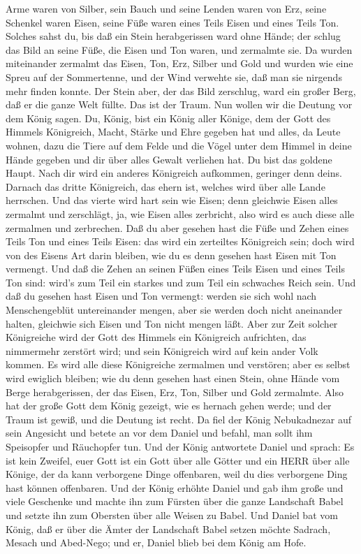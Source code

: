 Arme waren von Silber, sein Bauch und seine Lenden waren von Erz,
 seine Schenkel waren Eisen, seine Füße waren eines Teils
Eisen und eines Teils Ton.  Solches sahst du, bis daß ein
Stein herabgerissen ward ohne Hände; der schlug das Bild an seine Füße,
die Eisen und Ton waren, und zermalmte sie.  Da wurden
miteinander zermalmt das Eisen, Ton, Erz, Silber und Gold und wurden wie
eine Spreu auf der Sommertenne, und der Wind verwehte sie, daß man sie
nirgends mehr finden konnte. Der Stein aber, der das Bild zerschlug,
ward ein großer Berg, daß er die ganze Welt füllte.  Das
ist der Traum. Nun wollen wir die Deutung vor dem König sagen.
 Du, König, bist ein König aller Könige, dem der Gott des
Himmels Königreich, Macht, Stärke und Ehre gegeben hat  und
alles, da Leute wohnen, dazu die Tiere auf dem Felde und die Vögel unter
dem Himmel in deine Hände gegeben und dir über alles Gewalt verliehen
hat. Du bist das goldene Haupt.  Nach dir wird ein anderes
Königreich aufkommen, geringer denn deins. Darnach das dritte
Königreich, das ehern ist, welches wird über alle Lande herrschen.
 Und das vierte wird hart sein wie Eisen; denn gleichwie
Eisen alles zermalmt und zerschlägt, ja, wie Eisen alles zerbricht, also
wird es auch diese alle zermalmen und zerbrechen.  Daß du
aber gesehen hast die Füße und Zehen eines Teils Ton und eines Teils
Eisen: das wird ein zerteiltes Königreich sein; doch wird von des Eisens
Art darin bleiben, wie du es denn gesehen hast Eisen mit Ton vermengt.
 Und daß die Zehen an seinen Füßen eines Teils Eisen und
eines Teils Ton sind: wird's zum Teil ein starkes und zum Teil ein
schwaches Reich sein.  Und daß du gesehen hast Eisen und
Ton vermengt: werden sie sich wohl nach Menschengeblüt untereinander
mengen, aber sie werden doch nicht aneinander halten, gleichwie sich
Eisen und Ton nicht mengen läßt.  Aber zur Zeit solcher
Königreiche wird der Gott des Himmels ein Königreich aufrichten, das
nimmermehr zerstört wird; und sein Königreich wird auf kein ander Volk
kommen. Es wird alle diese Königreiche zermalmen und verstören; aber es
selbst wird ewiglich bleiben;  wie du denn gesehen hast
einen Stein, ohne Hände vom Berge herabgerissen, der das Eisen, Erz,
Ton, Silber und Gold zermalmte. Also hat der große Gott dem König
gezeigt, wie es hernach gehen werde; und der Traum ist gewiß, und die
Deutung ist recht.  Da fiel der König Nebukadnezar auf sein
Angesicht und betete an vor dem Daniel und befahl, man sollt ihm
Speisopfer und Räuchopfer tun.  Und der König antwortete
Daniel und sprach: Es ist kein Zweifel, euer Gott ist ein Gott über alle
Götter und ein HERR über alle Könige, der da kann verborgene Dinge
offenbaren, weil du dies verborgene Ding hast können offenbaren.
 Und der König erhöhte Daniel und gab ihm große und viele
Geschenke und machte ihn zum Fürsten über die ganze Landschaft Babel und
setzte ihn zum Obersten über alle Weisen zu Babel.  Und
Daniel bat vom König, daß er über die Ämter der Landschaft Babel setzen
möchte Sadrach, Mesach und Abed-Nego; und er, Daniel blieb bei dem König
am Hofe.

